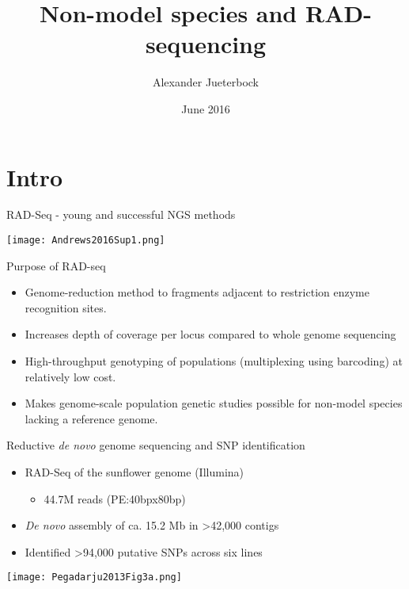 \documentclass[presentation]{beamer}
\author{Alexander Jueterbock}
\date{June 2016}
\title{Non-model species and RAD-sequencing}
\begin{document}
\maketitle



\section{Intro}
\label{sec-1}
\begin{frame}[label=sec-1-0-1]{RAD-Seq - young and successful NGS methods}
\begin{center}


\texttt{[image: Andrews2016Sup1.png]}

\tiny{\citep{Andrews2016}}
\end{center}
\end{frame}


\begin{frame}[label=sec-1-0-2]{Purpose of RAD-seq}
\begin{itemize}
\item Genome-reduction method to fragments adjacent to restriction enzyme
recognition sites.
\item Increases depth of coverage per locus compared to whole genome
sequencing
\item High-throughput genotyping of populations (multiplexing using
barcoding) at relatively low cost.
\item Makes genome-scale population genetic studies possible for non-model
species lacking a reference genome.
\end{itemize}
\end{frame}


\begin{frame}[label=sec-1-0-3]{Reductive \emph{de novo} genome sequencing and SNP identification}
\begin{itemize}
\item RAD-Seq of the sunflower genome (Illumina)
\begin{itemize}
\item 44.7M reads (PE:40bpx80bp)
\end{itemize}
\item \emph{De novo} assembly of ca. 15.2 Mb 
in >42,000 contigs
\item Identified >94,000 putative SNPs across six lines
\end{itemize}
\begin{center}

\texttt{[image: Pegadarju2013Fig3a.png]}


\tiny{\citep{Pegadaraju2013}}
\end{center}
\end{frame}
\end{document}
